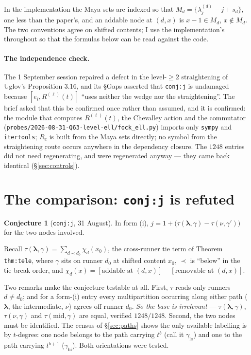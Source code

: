 \documentclass[11pt]{article}
\theoremstyle{definition}
\newtheorem{conjecture}[theorem]{Conjecture}
\theoremstyle{remark}
\newcommand{\bl}{\boldsymbol{\lambda}}
\begin{document}
In the implementation the Maya sets are indexed so that $M_d=\{\lambda^{(d)}_j-j+s_d\}$,
one less than the paper's, and an addable node at $(d,x)$ is $x-1\in M_d$, $x\notin M_d$.
The two conventions agree on shifted contents; I use the implementation's throughout so
that the formulas below can be read against the code.

\paragraph{The independence check.}
The 1 September session repaired a defect in the level-$\ge2$ straightening of Uglov's
Proposition 3.16, and its \S Gaps asserted that \texttt{conj:j} is undamaged because
$[e_i,R^{(\ell)}(t)]$ ``uses neither the wedge nor the straightening''. The brief asked
that this be confirmed once rather than assumed, and it is confirmed: the module that
computes $R^{(\ell)}(t)$, the Chevalley action and the commutator
(\texttt{probes/2026-08-31-Q63-level-ell/fock\_ell.py}) imports only \texttt{sympy} and
\texttt{itertools}; $R_e$ is built from the Maya sets directly; no symbol from the
straightening route occurs anywhere in the dependency closure. The $1248$ entries did not
need regenerating, and were regenerated anyway --- they came back identical
(\S\ref{sec:controls}).

\section{The comparison: \texttt{conj:j} is refuted}\label{sec:refute}

\begin{conjecture}[\texttt{conj:j}, 31 August]\label{conj:j}
In form (i), $j=1+\big(\tau(\bl,\gamma)-\tau(\nu,\gamma')\big)$ for the two nodes
involved.
\end{conjecture}

Recall $\tau(\bl,\gamma)=\sum_{d\prec d_0}\chi_d(x_0)$, the cross-runner tie term of
Theorem \texttt{thm:tele}, where $\gamma$ sits on runner $d_0$ at shifted content $x_0$,
$\prec$ is ``below'' in the tie-break order, and
$\chi_d(x)=[\text{addable at }(d,x)]-[\text{removable at }(d,x)]$.

Two remarks make the conjecture testable at all. First, $\tau$ reads only runners
$d\ne d_0$; and for a form-(i) entry every multipartition occurring along either path
($\bl$, the intermediate, $\nu$) agrees off runner $d_0$. \emph{So the base is
irrelevant} --- $\tau(\bl,\gamma)$, $\tau(\nu,\gamma)$ and $\tau(\text{mid},\gamma)$
are equal, verified $1248/1248$. Second, the two nodes must be identified. The census of
\S\ref{sec:paths} shows the only available labelling is by $t$-degree: one node belongs
to the path carrying $t^{b}$ (call it $\gamma_{\mathrm{lo}}$) and one to the path
carrying $t^{b+1}$ ($\gamma_{\mathrm{hi}}$). Both orientations were tested.
\end{document}
